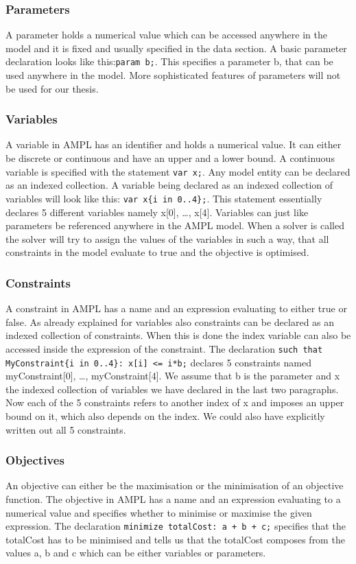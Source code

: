 \subsubsection{Parameters}
A parameter holds a numerical value which can be accessed anywhere in the model and it is fixed and usually specified in the data section. A basic parameter declaration looks like this:\verb=param b;=. This specifies a parameter b, that can be used anywhere in the model. More sophisticated features of parameters will not be used for our thesis.
\subsubsection{Variables}
A variable in AMPL has an identifier and holds a numerical value. It can either be discrete or continuous and have an upper and a lower bound. A continuous variable is specified with the statement \verb=var x;=. Any model entity can be declared as an indexed collection. A variable being declared as an indexed collection of variables will look like this: \verb=var x{i in 0..4};=. This statement essentially declares 5 different variables namely x[0], \ldots , x[4]. Variables can just like parameters be referenced anywhere in the AMPL model. When a solver is called the solver will try to assign the values of the variables in such a way, that all constraints in the model evaluate to true and the objective is optimised.
\subsubsection{Constraints}
A constraint in AMPL has a name and an expression evaluating to either true or false. As already explained for variables also constraints can be declared as an indexed collection of constraints. When this is done the index variable can also be accessed inside the expression of the constraint. The declaration \verb&such that MyConstraint{i in 0..4}: x[i] <= i*b;& declares 5 constraints named myConstraint[0], \ldots, myConstraint[4]. We assume that b is the parameter and x the indexed collection of variables we have declared in the last two paragraphs. Now each of the 5 constraints refers to another index of x and imposes an upper bound on it, which also depends on the index. We could also have explicitly written out all 5 constraints.
\subsubsection{Objectives}
An objective can either be the maximisation or the minimisation of an objective function. The objective in AMPL has a name and an expression evaluating to a numerical value and specifies whether to minimise or maximise the given expression. The declaration \verb&minimize totalCost: a + b + c;& specifies that the totalCost has to be minimised and tells us that the totalCost composes from the values a, b and c which can be either variables or parameters. 

